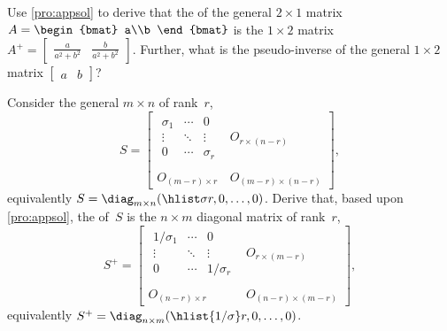 \begin{exercise}  
Use \cref{pro:appsol} to derive that the  of the general \(2\times 1\) matrix \(A=\begin{bmat} a\\b \end{bmat}\) is the \(1\times 2\) matrix \(A^+=\begin{bmatrix} \tfrac a{a^2+b^2}&\tfrac b{a^2+b^2} \end{bmatrix}\).  
Further, what is the pseudo-inverse of the general \(1\times2\) matrix \(\begin{bmatrix} a&b \end{bmatrix}\)?
\end{exercise}





\begin{exercise} \label{ex:pidiag} 
Consider the general \(m\times n\)  of rank~\(r\), 
\begin{equation*}
S=\begin{bmatrix} \begin{matrix} \sigma_1&\cdots&0\\
\vdots&\ddots&\vdots\\
0&\cdots&\sigma_r \end{matrix} & 
O_{r\times (n-r)}\\\,\\
O_{(m-r)\times r}&O_{(m-r)\times (n-r)}\end{bmatrix},
\end{equation*}
equivalently \(S=\diag_{m\times n}(\hlist\sigma r,0,\ldots,0)\).
Derive that, based upon \cref{pro:appsol}, the  of~\(S\) is the \(n\times m\) diagonal matrix of rank~\(r\),
\begin{equation*}
S^+=\begin{bmatrix} \begin{matrix} 1/{\sigma_1}&\cdots&0\\
\vdots&\ddots&\vdots\\
0&\cdots&1/\sigma_r \end{matrix} & 
O_{r\times (m-r)}\\\,\\
O_{(n-r)\times r}&O_{(n-r)\times (m-r)}\end{bmatrix},
\end{equation*}
equivalently \(S^+=\diag_{n\times m}(\hlist{1/\sigma}r,0,\ldots,0)\).
\end{exercise}





